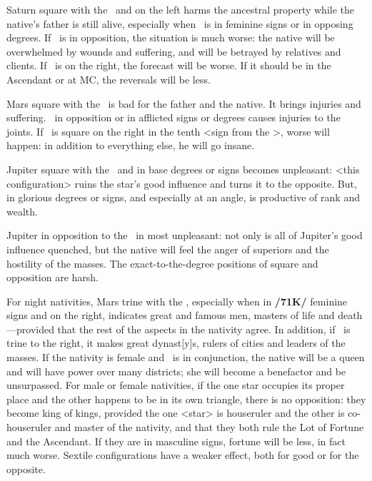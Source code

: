 Saturn \marginnote{\Saturn \Square \Sun} square with the \Sun\, and on the left harms the ancestral property while the native’s father is still alive, especially when \Saturn\, is in feminine signs or in opposing degrees. If \Saturn\, is in opposition, the situation is much worse: the native will be overwhelmed by wounds and suffering, and will be betrayed by relatives and clients. If \Saturn\, is on the right, the forecast will be worse. If it should be in the Ascendant or at MC, the reversals will be less.

Mars \marginnote{\Mars \Square \Sun} square with the \Sun\, is bad for the father and the native. It brings injuries and suffering. \Mars\, in opposition or in afflicted signs or degrees causes injuries to the joints. If \Mars\, is square on the right in the tenth <sign from the \Sun>, worse will happen: in addition to everything else, he will go insane.

Jupiter \marginnote{\Jupiter \Square \Sun} square with the \Sun\, and in base degrees or signs becomes unpleasant: <this configuration> ruins the star’s good influence and turns it to the opposite. But, \Jupiter\, in glorious degrees or signs, and especially at an angle, is productive of rank and wealth. 

Jupiter \marginnote{\Jupiter \Opposition \Sun} in opposition to the \Sun\, in most unpleasant: not only is all of Jupiter’s good influence quenched, but the native will feel the anger of superiors and the hostility of the masses. The \mndl exact-to-the-degree positions of square and opposition are
harsh.

For night nativities, Mars \marginnote{\Mars \Trine \Sun} trine with the \Sun, especially when in \textbf{/71K/} feminine signs and on the right, indicates great and famous men, masters of life and death—provided that the rest of the aspects in the nativity agree. In addition, if \Jupiter\, is trine to the right, it makes great dynast[y]s, rulers of cities and leaders of the masses. If the nativity is female and \Venus\, is in conjunction, the native will be a queen and will have power over many districts; she will become a benefactor and be unsurpassed. For male or female nativities, if the one star occupies its proper place and the other happens to be in its own triangle, there is
no opposition: they become king of kings, provided the one <star> is houseruler and the other is co-houseruler and master of the nativity, and that they both rule the Lot of Fortune and the Ascendant. If they are in masculine signs, fortune will be less, in fact much worse.  Sextile \mndl configurations have a weaker effect, both for good or for the opposite.

